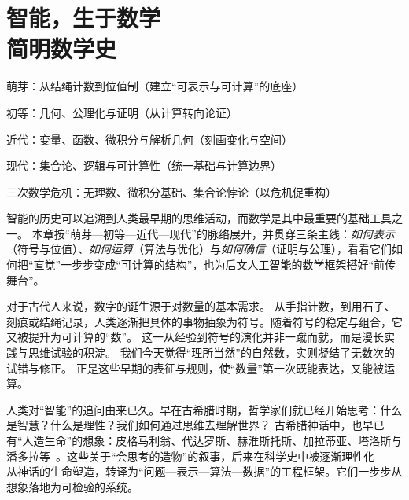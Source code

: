 \chapter{智能，生于数学 \texorpdfstring{\\}{ }简明数学史}

\begin{introduction}
\item 萌芽：从结绳计数到位值制（建立“可表示与可计算”的底座）
\item 初等：几何、公理化与证明（从计算转向论证）
\item 近代：变量、函数、微积分与解析几何（刻画变化与空间）
\item 现代：集合论、逻辑与可计算性（统一基础与计算边界）
\item 三次数学危机：无理数、微积分基础、集合论悖论（以危机促重构）
\end{introduction}

\begin{introduction}
  \item 
  \item   
   \item 
  \item 
  \end{introduction}



智能的历史可以追溯到人类最早期的思维活动，而数学是其中最重要的基础工具之一。
本章按“萌芽—初等—近代—现代”的脉络展开，并贯穿三条主线：\emph{如何表示}（符号与位值）、\emph{如何运算}（算法与优化）与\emph{如何确信}（证明与公理），看看它们如何把“直觉”一步步变成“可计算的结构”，也为后文人工智能的数学框架搭好“前传舞台”。

对于古代人来说，数字的诞生源于对数量的基本需求。  
从手指计数，到用石子、刻痕或结绳记录，人类逐渐把具体的事物抽象为符号。随着符号的稳定与组合，它又被提升为可计算的“数”。    
这一从经验到符号的演化并非一蹴而就，而是漫长实践与思维试验的积淀。  
我们今天觉得“理所当然”的自然数，实则凝结了无数次的试错与修正。
正是这些早期的表征与规则，使“数量”第一次既能表达，又能被运算。

人类对“智能”的追问由来已久。早在古希腊时期，哲学家们就已经开始思考：什么是智慧？什么是理性？我们如何通过思维去理解世界？
古希腊神话中，也早已有“人造生命”的想象：皮格马利翁、代达罗斯、赫淮斯托斯、加拉蒂亚、塔洛斯与潘多拉等~{\cite{OvidMartin2004,Sparkes1996,Tandy1997}}。这些关于“会思考的造物”的叙事，后来在科学史中被逐渐理性化——从神话的生命塑造，转译为“问题—表示—算法—数据”的工程框架。它们一步步从想象落地为可检验的系统。

